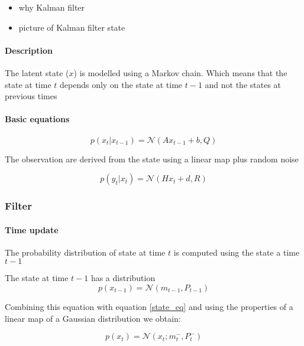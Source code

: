 \documentclass{article}
\begin{document}
\begin{itemize}
    \item why Kalman filter
    \item picture of Kalman filter state
\end{itemize}

\paragraph{Description}

The latent state ($x$) is modelled using a Markov chain. Which means that the state at time $t$ depends only on the state at time $t-1$ and not the states at previous times

\paragraph{Basic equations}

\begin{equation}\label{state_eq}
p(x_t | x_{t-1}) = \mathcal{N}(Ax_{t-1} + b, Q)
\end{equation}

The observation are derived from the state using a linear map plus random noise

\begin{equation}\label{obs_from_state}
    p(y_t | x_t) = \mathcal{N}(Hx_t + d, R)
\end{equation}

\subsubsection{Filter}

\paragraph{Time update}

The probability distribution of state at time $t$ is computed using the state a time $t-1$

The state at time $t-1$ has a distribution $$ p(x_{t-1}) = \mathcal{N}(m_{t-1}, P_{t-1}) $$ 

Combining this equation with equation \ref{state_eq} and using the properties of a linear map of a Gaussian distribution we obtain:

\begin{equation}
    \label{filter_predict}p(x_t) = \mathcal{N}(x_t; m_t^-, P_t^-)
\end{equation} 
\end{document}
